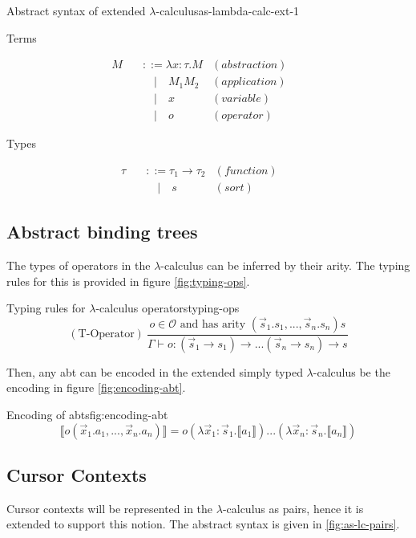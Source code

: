 \documentclass{article}
\begin{document}
\begin{myfigure}{Abstract syntax of extended $\lambda$-calculus}{as-lambda-calc-ext-1}
\begin{center}
Terms
\end{center}
\[
\begin{aligned}
M \quad &::= \lambda x : \tau.M &(abstraction) &&\\
& \quad | \quad M_1 M_2 &(application) &&\\
& \quad | \quad x &(variable) &&\\
& \quad | \quad o &(operator)
\end{aligned}
\]

\begin{center}
Types
\end{center}
\[
\begin{aligned}
\tau \quad &::= \tau_1 \rightarrow \tau_2 &(function) &&\\
& \quad | \quad s &(sort)
\end{aligned}
\]
\end{myfigure}

\subsection{Abstract binding trees}

The types of operators in the $\lambda$-calculus can be inferred by their arity. The typing rules for this is provided in figure \ref{fig:typing-ops}.

\begin{myfigure}{Typing rules for $\lambda$-calculus operators}{typing-ops}
\[
(\text{T-Operator}) \ \frac{o \in \mathcal{O} \text{ and has arity } (\Vec{s}_1.s_1,...,\Vec{s}_n.s_n)s}{\Gamma \vdash o : (\Vec{s}_1 \rightarrow s_1) \rightarrow ... (\Vec{s}_n \rightarrow s_n) \rightarrow s}
\]
\end{myfigure}

Then, any abt can be encoded in the extended simply typed $\lambda$-calculus be the encoding in figure \ref{fig:encoding-abt}.

\begin{myfigure}{Encoding of abts}{fig:encoding-abt}
\[
\llbracket o(\Vec{x}_1.a_1,...,\Vec{x}_n.a_n) \rrbracket = o(\lambda \Vec{x}_1:\Vec{s}_1.\llbracket a_1 \rrbracket)...(\lambda \Vec{x}_n : \Vec{s}_n.\llbracket a_n \rrbracket)
\]
\end{myfigure}

\subsection{Cursor Contexts}
Cursor contexts will be represented in the $\lambda$-calculus as pairs, hence it is extended to support this notion. The abstract syntax is given in \ref{fig:as-lc-pairs}. 
\end{document}
